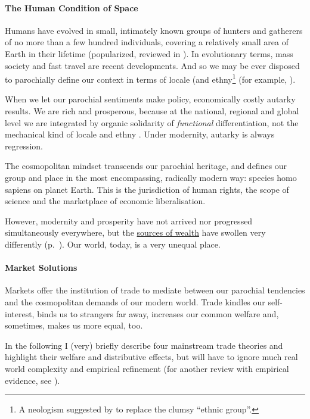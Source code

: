 \paragraph{The Human Condition of Space} Humans have evolved in small, intimately known groups of hunters and gatherers of no more than a few hundred individuals, covering a relatively small area of Earth in their lifetime (popularized, reviewed in \citealt{Diamond1997}). In evolutionary terms, mass society and fast travel are recent developments. And so we may be ever disposed to parochially define our context in terms of locale (and ethny\footnote{
	A neologism suggested by \citeauthor{Van-den-Berghe-1981-aa} to replace the clumsy ``ethnic group''.}
(for example, \citealt{Van-den-Berghe-1981-aa}).

When we let our parochial sentiments make policy, economically costly autarky results. We are rich and prosperous, because at the national, regional and global level we are integrated by organic solidarity of \emph{functional} differentiation, not the mechanical kind of locale and ethny \citep{Durkheim-1893-aa}. Under modernity, autarky is always regression.

The cosmopolitan mindset transcends our parochial heritage, and defines our group and place in the most encompassing, radically modern way: species homo sapiens on planet Earth. This is the jurisdiction of human rights, the scope of science and the marketplace of economic liberalisation.

However, modernity and prosperity have not arrived nor progressed simultaneously everywhere, but the  \hyperref[sec:sources-of-wealth]{sources of wealth} have swollen very differently (p.~\pageref{sec:sources-of-wealth}). Our world, today, is a very unequal place.

\paragraph{Market Solutions}  \label{sec:trade} Markets offer the institution of trade to mediate between our parochial tendencies and the cosmopolitan demands of our modern world. Trade kindles our self-interest, binds us to strangers far away, increases our common welfare and, sometimes, makes us more equal, too. %

In the following I (very) briefly describe four mainstream trade theories and highlight their welfare and distributive effects, but will have to ignore much real world complexity and empirical refinement (for another review with empirical evidence, see \citealt{Beckfield2009}).

